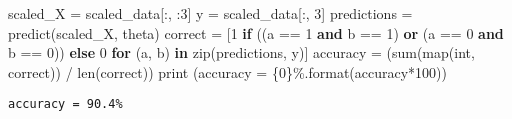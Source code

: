 \documentclass[
]{article}
\newenvironment{Shaded}{}{}
\newcommand{\BuiltInTok}[1]{#1}
\newcommand{\ControlFlowTok}[1]{\textcolor[rgb]{0.00,0.44,0.13}{\textbf{#1}}}
\newcommand{\DecValTok}[1]{\textcolor[rgb]{0.25,0.63,0.44}{#1}}
\newcommand{\KeywordTok}[1]{\textcolor[rgb]{0.00,0.44,0.13}{\textbf{#1}}}
\newcommand{\NormalTok}[1]{#1}
\newcommand{\OperatorTok}[1]{\textcolor[rgb]{0.40,0.40,0.40}{#1}}
\newcommand{\SpecialCharTok}[1]{\textcolor[rgb]{0.25,0.44,0.63}{#1}}
\newcommand{\StringTok}[1]{\textcolor[rgb]{0.25,0.44,0.63}{#1}}
\begin{document}
\begin{Shaded}
\begin{Highlighting}[]
\NormalTok{scaled\_X }\OperatorTok{=}\NormalTok{ scaled\_data[:, :}\DecValTok{3}\NormalTok{]}
\NormalTok{y }\OperatorTok{=}\NormalTok{ scaled\_data[:, }\DecValTok{3}\NormalTok{]}
\NormalTok{predictions }\OperatorTok{=}\NormalTok{ predict(scaled\_X, theta)}
\NormalTok{correct }\OperatorTok{=}\NormalTok{ [}\DecValTok{1} \ControlFlowTok{if}\NormalTok{ ((a }\OperatorTok{==} \DecValTok{1} \KeywordTok{and}\NormalTok{ b }\OperatorTok{==} \DecValTok{1}\NormalTok{) }\KeywordTok{or}\NormalTok{ (a }\OperatorTok{==} \DecValTok{0} \KeywordTok{and}\NormalTok{ b }\OperatorTok{==} \DecValTok{0}\NormalTok{)) }\ControlFlowTok{else} \DecValTok{0} \ControlFlowTok{for}\NormalTok{ (a, b) }\KeywordTok{in} \BuiltInTok{zip}\NormalTok{(predictions, y)]}
\NormalTok{accuracy }\OperatorTok{=}\NormalTok{ (}\BuiltInTok{sum}\NormalTok{(}\BuiltInTok{map}\NormalTok{(}\BuiltInTok{int}\NormalTok{, correct)) }\OperatorTok{/} \BuiltInTok{len}\NormalTok{(correct))}
\BuiltInTok{print}\NormalTok{ (}\StringTok{\textquotesingle{}accuracy = }\SpecialCharTok{\{0\}}\StringTok{\%\textquotesingle{}}\NormalTok{.}\BuiltInTok{format}\NormalTok{(accuracy}\OperatorTok{*}\DecValTok{100}\NormalTok{))}
\end{Highlighting}
\end{Shaded}

\begin{verbatim}
accuracy = 90.4%
\end{verbatim}
\end{document}
